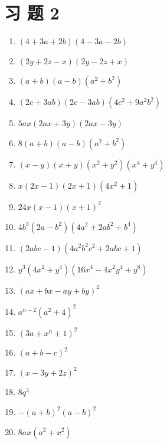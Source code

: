 \documentclass[10pt]{article}
\begin{document}
\section*{习 题 2}
\begin{enumerate}
  \item $(4+3 a+2 b)(4-3 a-2 b)$
  \item $(2 y+2 z-x)(2 y-2 z+x)$
  \item $(a+b)(a-b)\left(a^{2}+b^{2}\right)$
  \item $(2 c+3 a b)(2 c-3 a b)\left(4 c^{2}+9 a^{2} b^{2}\right)$
  \item $5 a x(2 a x+3 y)(2 a x-3 y)$
  \item $8(a+b)(a-b)\left(a^{2}+b^{2}\right)$
  \item $(x-y)(x+y)\left(x^{2}+y^{2}\right)\left(x^{4}+y^{4}\right)$
  \item $x(2 x-1)(2 x+1)\left(4 x^{2}+1\right)$
  \item $24 x(x-1)(x+1)^{2}$
  \item $4 b^{3}\left(2 a-b^{2}\right)\left(4 a^{2}+2 a b^{2}+b^{4}\right)$
  \item $(2 a b c-1)\left(4 a^{2} b^{2} c^{2}+2 a b c+1\right)$
  \item $y^{3}\left(4 x^{2}+y^{4}\right)\left(16 x^{4}-4 x^{2} y^{4}+y^{8}\right)$
  \item $(a x+b x-a y+b y)^{2}$
  \item $a^{n-2}\left(a^{2}+4\right)^{2}$
  \item $\left(3 a+x^{n}+1\right)^{2}$
  \item $(a+b-c)^{2}$
  \item $(x-3 y+2 z)^{2}$
  \item $8 q^{3}$
  \item $-(a+b)^{2}(a-b)^{2}$
  \item $8 a x\left(a^{2}+x^{2}\right)$
\end{enumerate}
\end{document}
